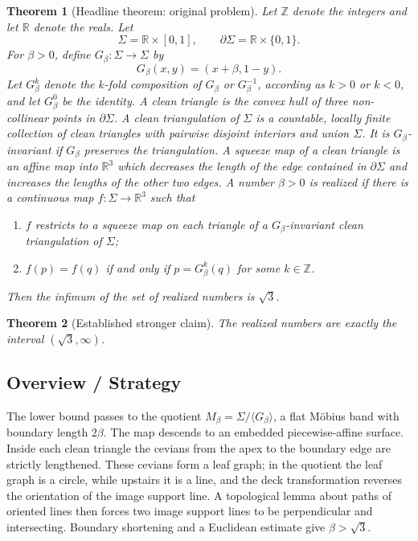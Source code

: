 \documentclass[12pt]{article}
\newcommand{\R}{\mathbb R}
\newcommand{\Z}{\mathbb Z}
\theoremstyle{plain}
\newtheorem{theorem}{Theorem}
\begin{document}
\begin{theorem}[Headline theorem: original problem]\label{thm:headline}
\normalfont
Let \(\Z\) denote the integers and let \(\R\) denote the reals.  Let
\[
\Sigma=\R\times[0,1],\qquad \partial\Sigma=\R\times\{0,1\}.
\]
For \(\beta>0\), define \(G_\beta:\Sigma\to\Sigma\) by
\[
G_\beta(x,y)=(x+\beta,1-y).
\]
Let \(G_\beta^k\) denote the \(k\)-fold composition of \(G_\beta\) or
\(G_\beta^{-1}\), according as \(k>0\) or \(k<0\), and let
\(G_\beta^0\) be the identity.  A \emph{clean triangle} is the convex hull of
three non-collinear points in \(\partial\Sigma\).  A \emph{clean triangulation}
of \(\Sigma\) is a countable, locally finite collection of clean triangles
with pairwise disjoint interiors and union \(\Sigma\).  It is
\(G_\beta\)-\emph{invariant} if \(G_\beta\) preserves the triangulation.  A
\emph{squeeze map} of a clean triangle is an affine map into \(\R^3\) which
decreases the length of the edge contained in \(\partial\Sigma\) and increases
the lengths of the other two edges.  A number \(\beta>0\) is \emph{realized}
if there is a continuous map \(f:\Sigma\to\R^3\) such that
\begin{enumerate}
\item \(f\) restricts to a squeeze map on each triangle of a
\(G_\beta\)-invariant clean triangulation of \(\Sigma\);
\item \(f(p)=f(q)\) if and only if \(p=G_\beta^k(q)\) for some \(k\in\Z\).
\end{enumerate}
Then the infimum of the set of realized numbers is \(\sqrt3\).
\end{theorem}

\begin{theorem}[Established stronger claim]\label{thm:strong}
The realized numbers are exactly the interval \((\sqrt3,\infty)\).
\end{theorem}

\subsection*{Overview / Strategy}

The lower bound passes to the quotient
\(M_\beta=\Sigma/\langle G_\beta\rangle\), a flat M\"obius band with boundary
length \(2\beta\).  The map descends to an embedded piecewise-affine surface.
Inside each clean triangle the cevians from the apex to the boundary edge are
strictly lengthened.  These cevians form a leaf graph; in the quotient the leaf
graph is a circle, while upstairs it is a line, and the deck transformation
reverses the orientation of the image support line.  A topological lemma about
paths of oriented lines then forces two image support lines to be perpendicular
and intersecting.  Boundary shortening and a Euclidean estimate give
\(\beta>\sqrt3\).
\end{document}

